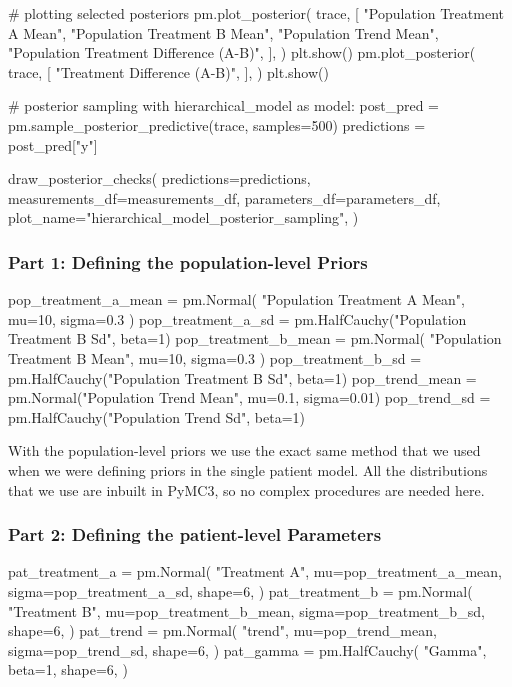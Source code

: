 \documentclass[12pt,a4paper,leqno]{report}
\theoremstyle{plain}
\theoremstyle{definition}
\theoremstyle{remark}
\begin{document}
\begin{pyverbatim}[][fontsize=\footnotesize]
    # plotting selected posteriors
    pm.plot_posterior(
        trace,
        [
            "Population Treatment A Mean",
            "Population Treatment B Mean",
            "Population Trend Mean",
            "Population Treatment Difference (A-B)",
        ],
    )
    plt.show()
    pm.plot_posterior(
        trace,
        [
            "Treatment Difference (A-B)",
        ],
    )
    plt.show()

# posterior sampling
with hierarchical_model as model:
    post_pred = pm.sample_posterior_predictive(trace, samples=500)
    predictions = post_pred["y"]

draw_posterior_checks(
    predictions=predictions,
    measurements_df=measurements_df,
    parameters_df=parameters_df,
    plot_name="hierarchical_model_posterior_sampling",
)
\end{pyverbatim}
\bigskip

\subsubsection*{Part 1: Defining the population-level Priors}
\bigskip
\begin{pyverbatim}[][fontsize=\footnotesize]
    pop_treatment_a_mean = pm.Normal(
        "Population Treatment A Mean", mu=10, sigma=0.3
    )
    pop_treatment_a_sd = pm.HalfCauchy("Population Treatment B Sd", beta=1)
    pop_treatment_b_mean = pm.Normal(
        "Population Treatment B Mean", mu=10, sigma=0.3
    )
    pop_treatment_b_sd = pm.HalfCauchy("Population Treatment B Sd", beta=1)
    pop_trend_mean = pm.Normal("Population Trend Mean", mu=0.1, sigma=0.01)
    pop_trend_sd = pm.HalfCauchy("Population Trend Sd", beta=1)
\end{pyverbatim}
\bigskip

With the population-level priors we use the exact same method that we used when we were
defining priors in the single patient model. All the distributions that we use are
inbuilt in PyMC3, so no complex procedures are needed here.

\subsubsection*{Part 2: Defining the patient-level Parameters}

\bigskip
\begin{pyverbatim}[][fontsize=\footnotesize]
    pat_treatment_a = pm.Normal(
        "Treatment A",
        mu=pop_treatment_a_mean,
        sigma=pop_treatment_a_sd,
        shape=6,
    )
    pat_treatment_b = pm.Normal(
        "Treatment B",
        mu=pop_treatment_b_mean,
        sigma=pop_treatment_b_sd,
        shape=6,
    )
    pat_trend = pm.Normal(
        "trend",
        mu=pop_trend_mean,
        sigma=pop_trend_sd,
        shape=6,
    )
    pat_gamma = pm.HalfCauchy(
        "Gamma", beta=1, shape=6,
    )
\end{pyverbatim}
\bigskip
\end{document}
